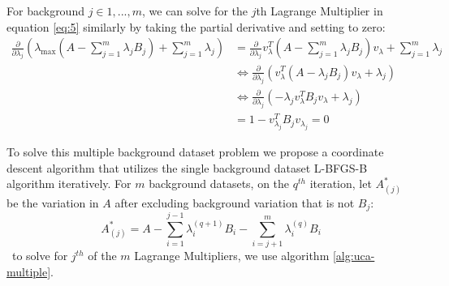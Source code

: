 \documentclass[12pt]{article}
\begin{document}
For background $j \in 1,...,m$, we can solve for the $j$th Lagrange Multiplier in equation \ref{eq:5} similarly by taking the partial derivative and setting to zero:
\begin{align}
    \frac{\partial}{\partial \lambda_j}\left(\lambda_{\text{max}}\left(A - \sum^{m}_{j = 1}{\lambda_j B_j}\right) + \sum^{m}_{j=1}{\lambda_j}\right)&=\frac{\partial}{\partial \lambda_j}v_{\lambda}^T\left(A - \sum^{m}_{j = 1}{\lambda_j B_j}\right)v_{\lambda} + \sum^{m}_{j=1}{\lambda_j}\nonumber\\
                                                                                                                                                    &\Leftrightarrow \frac{\partial}{\partial \lambda_j}\left(v_{\lambda}^T\left(A - \lambda_j B_j \right)v_{\lambda}+\lambda_j\right)\nonumber \\ 
                                                                                                                        &\Leftrightarrow \frac{\partial}{\partial \lambda_j}\left(-\lambda_j v_{\lambda}^T  B_j v_{\lambda} +\lambda_j \right)\nonumber \\ 
                                                                                                                        &= 1-v_{\lambda_j}^{T}B_j v_{\lambda_j} = 0 \label{eq:6}
\end{align}

To solve this multiple background dataset problem we propose a coordinate descent algorithm that utilizes the single background dataset L-BFGS-B \cite{byrd1995limited} algorithm iteratively.
For $m$ background datasets, on the $q^{th}$ iteration, let $A_{(j)}^*$ be the variation in $A$ after excluding background variation that is not $B_j$:
\[A_{(j)}^{*} = A - \sum_{ i = 1 }^{j-1}\lambda_{i}^{(q+1)}B_i - \sum_{i =j+1}^{m}\lambda_{i}^{(q)}B_i \] \
to solve for $j^{th}$ of the $m$ Lagrange Multipliers, we use algorithm \ref{alg:uca-multiple}.
\end{document}
